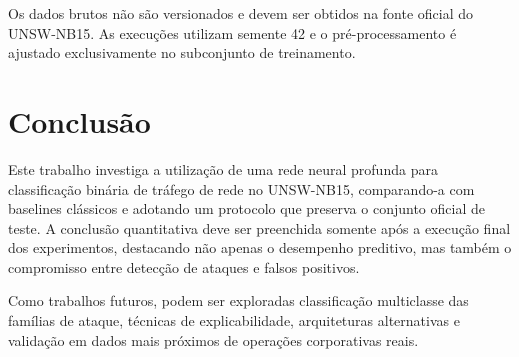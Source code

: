 \documentclass[12pt]{article}
\begin{document}
Os dados brutos não são versionados e devem ser obtidos na fonte oficial do UNSW-NB15. As execuções utilizam semente 42 e o pré-processamento é ajustado exclusivamente no subconjunto de treinamento.

\section{Conclusão}
\label{sec:conclusao}

Este trabalho investiga a utilização de uma rede neural profunda para classificação binária de tráfego de rede no UNSW-NB15, comparando-a com baselines clássicos e adotando um protocolo que preserva o conjunto oficial de teste. A conclusão quantitativa deve ser preenchida somente após a execução final dos experimentos, destacando não apenas o desempenho preditivo, mas também o compromisso entre detecção de ataques e falsos positivos.

Como trabalhos futuros, podem ser exploradas classificação multiclasse das famílias de ataque, técnicas de explicabilidade, arquiteturas alternativas e validação em dados mais próximos de operações corporativas reais.



\end{document}

